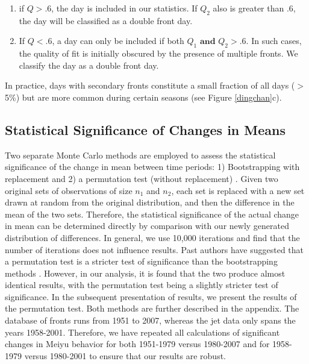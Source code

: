 \documentclass[draft,grl]{AGUTeX}
\begin{document}
\begin{article}
\begin{enumerate}
	\item if $Q>.6$, the day is included in our statistics. If $Q_2$ also is greater than .6, the day will be classified as a double front day.
		
	\item If $Q<.6$, a day can only be included if both $Q_1 \mathrm{\textbf{ and }} Q_2 > .6$. In such cases, the quality of fit is initially obscured by the presence of multiple fronts. We classify the day as a double front day.
\end{enumerate}	
		
	In practice, days with secondary fronts constitute a small fraction of all days ($>$ 5\%) but are more common during certain seasons (see Figure \ref{dingchan}c).

\subsection{Statistical Significance of Changes in Means}

	Two separate Monte Carlo methods are employed to assess the statistical significance of the change in mean between time periods: 1) Bootstrapping with replacement and 2) a permutation test (without replacement) \citep{Good2005}. Given two original sets of observations of size $n_1$ and $n_2$, each set is replaced with a new set drawn at random from the original distribution, and then the difference in the mean of the two sets. Therefore, the statistical significance of the actual change in mean can be determined directly by comparison with our newly generated distribution of differences. In general, we use 10,000 iterations and find that the number of iterations does not influence results. Past authors have suggested that a permutation test is a stricter test of significance than the bootstrapping methods \citep{Hesterberg2003}. However, in our analysis, it is found that the two produce almost identical results, with the permutation test being a slightly stricter test of significance. In the subsequent presentation of results, we present the results of the permutation test. Both methods are further described in the appendix. The database of fronts runs from 1951 to 2007, whereas the jet data only spans the years 1958-2001. Therefore, we have repeated all calculations of significant changes in Meiyu behavior for both 1951-1979 versus 1980-2007 and for 1958-1979 versus 1980-2001 to ensure that our results are robust.


\end{article}
\end{document}
